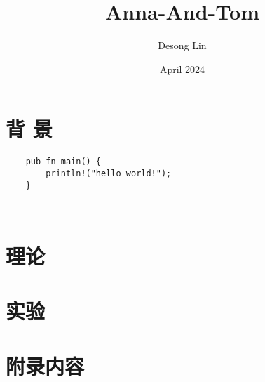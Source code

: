 \documentclass[UTF8,nofonts]{ctexart}
\title{\fontsize{18}{19}\selectfont Anna-And-Tom}
\author{Desong Lin}
\date{April 2024}
\begin{document}
\maketitle
\fontsize{13}{15}\selectfont
\tableofcontents %

\section{背 景}


\begin{verbatim}
    pub fn main() {
        println!("hello world!");
    }
\end{verbatim}
\lipsum[1-2] %

\
\section{理论}
\lipsum[3-4] %

\section{实验}
\lipsum[5-6] %

\appendix
\section{附录内容}
\lipsum[7-8] %
\end{document}
